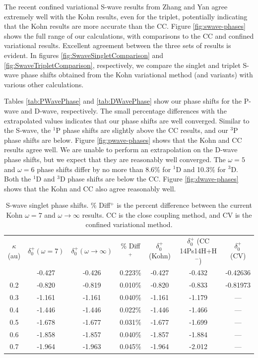 \documentclass[preprint,showpacs,preprintnumbers,amsmath,amssymb]{revtex4}
\begin{document}
The recent confined variational S-wave results from Zhang and Yan \cite{Zhang2012} agree extremely well with the Kohn results, even for the triplet, potentially indicating that the Kohn results are more accurate than the CC. Figure \ref{fig:swave-phases} shows the full range of our calculations, with comparisons to the CC and confined variational results. Excellent agreement between the three sets of results is evident. In figures \ref{fig:SwaveSingletComparison} and \ref{fig:SwaveTripletComparison}, respectively, we compare the singlet and triplet S-wave phase shifts obtained from the Kohn variational method (and variants) with various other calculations.

Tables \ref{tab:PWavePhase} and \ref{tab:DWavePhase} show our phase shifts for the P-wave and D-wave, respectively. The small percentage differences with the extrapolated values indicates that our phase shifts are well converged. Similar to the S-wave, the $^1$P phase shifts are slightly above the CC results, and our $^3$P phase shifts are below. Figure \ref{fig:pwave-phases} shows that the Kohn and CC results agree well. We are unable to perform an extrapolation on the D-wave phase shifts, but we expect that they are reasonably well converged. The $\omega = 5$ and $\omega = 6$ phase shifts differ by no more than 8.6\% for $^1$D and 10.3\% for $^3$D. Both the $^1$D and $^3$D phase shifts are below the CC. Figure \ref{fig:dwave-phases} shows that the Kohn and CC also agree reasonably well.


\begin{table}[H]
\centering
\begin{ruledtabular}
\begin{tabular}{c c c c c c c}
$\kappa$ (au) & $\delta_0^+ (\omega = 7)$ & $\delta_0^+ (\omega \rightarrow \infty)$ & \% Diff$^+$ & $\delta_0^+$ (Kohn) \cite{VanReeth2003} & $\delta_0^+$ (CC 14Ps14H+H$^-$) \cite{Walters2004} & $\delta_0^+$ (CV) \cite{Zhang2012} \\
\colrule
0.1 & -0.427 & -0.426 & 0.223\% & -0.427 & -0.432 & -0.42636 \\
0.2 & -0.820 & -0.819 & 0.010\% & -0.820 & -0.833 & -0.81973 \\
0.3 & -1.161 & -1.161 & 0.040\% & -1.161 & -1.179 & --- \\
0.4 & -1.446 & -1.446 & 0.022\% & -1.446 & -1.466 & --- \\
0.5 & -1.678 & -1.677 & 0.031\% & -1.677 & -1.699 & --- \\
0.6 & -1.858 & -1.857 & 0.040\% & -1.857 & -1.884 & --- \\
0.7 & -1.964 & -1.963 & 0.045\% & -1.964 & -2.012 & --- \\
\end{tabular}
\end{ruledtabular}
\caption{S-wave singlet phase shifts. \% Diff$^+$ is the percent difference between the current Kohn $\omega = 7$ and $\omega \rightarrow \infty$ results. CC is the close coupling method, and CV is the confined variational method.}
\label{tab:SWaveSingletPhase}
\end{table}
\end{document}
